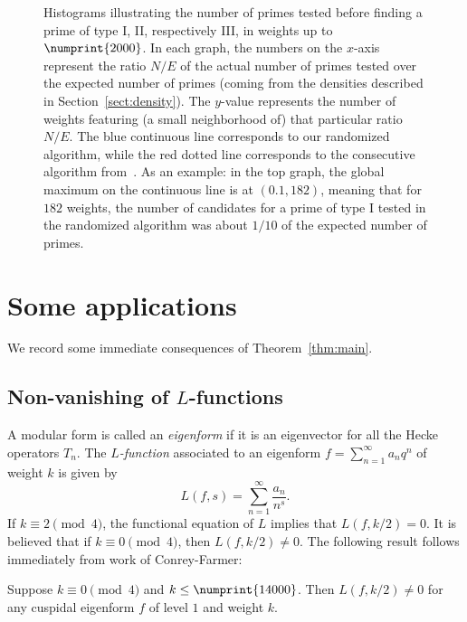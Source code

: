 \documentclass{book}
\newcommand{\bound}{\numprint{14000}}
\begin{document}
\begin{figure}[h]
\begin{center}
\end{center}
\caption{Histograms illustrating the number of primes tested before finding a
  prime of type I, II, respectively III, in weights up to $\numprint{2000}$.  
  In each graph, the numbers on the
$x$-axis represent the ratio $N/E$ of the actual number of primes tested over
the expected number of primes (coming from the densities described in
Section~\ref{sect:density}).  The $y$-value represents the number of weights
featuring (a small neighborhood of) that particular ratio $N/E$.  The blue 
continuous line corresponds to our randomized algorithm, while the red dotted 
line corresponds to the consecutive algorithm from~\cite{ConreyFarmer}.  
As an example: in the top graph, the global maximum on the continuous line is
at $(0.1, 182)$, meaning that for $182$ weights, the number of candidates for
a prime of type I tested in the randomized algorithm was about $1/10$ of the 
expected number of primes.}
\label{fig:histogram}
\end{figure}


\section{Some applications}
\label{sect:applications}

We record some immediate consequences of Theorem~\ref{thm:main}.

\subsection{Non-vanishing of $L$-functions}
A modular form is called an \emph{eigenform} if it is an eigenvector for all
the Hecke operators $T_n$.
The \emph{$L$-function} associated to an eigenform 
$f=\sum_{n=1}^\infty a_n q^n$ of weight $k$ is given by
\begin{equation*}
  L(f, s)=\sum_{n=1}^\infty \frac{a_n}{n^s}.
\end{equation*}
If $k\equiv 2\pmod{4}$, the functional equation of $L$ implies that
$L(f, k/2)=0$.  It is believed that if $k\equiv 0\pmod{4}$, then $L(f, k/2)\neq
0$.  The following result follows immediately from work of Conrey-Farmer: 

\begin{corollary}
  Suppose $k\equiv 0\pmod{4}$ and $k\leq\bound$.  Then
  $L(f, k/2)\neq 0$ for any cuspidal eigenform $f$ of level $1$ and weight $k$.
\end{corollary}
\end{document}
